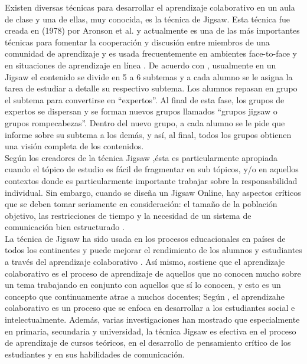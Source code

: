 Existen diversas técnicas para desarrollar el aprendizaje colaborativo en un aula de clase y una de ellas, muy conocida, es la técnica de Jigsaw. Esta técnica fue creada en (1978) por Aronson et al. y actualmente es una de las más importantes técnicas para fomentar la cooperación y discusión entre miembros de una comunidad de aprendizaje y es usada frecuentemente en ambientes face-to-face y en situaciones de aprendizaje en línea \cite{blocher_increasing_2005}. De acuerdo con \cite{aronson_jigsaw_1978}, usualmente en un Jigsaw el contenido se divide en 5 a 6 subtemas y a cada alumno se le asigna la tarea de estudiar a detalle su respectivo subtema. Los alumnos repasan en grupo el subtema para convertirse en “expertos”. Al final de esta fase, los grupos de expertos se dispersan y se forman nuevos grupos llamados “grupos jigsaw o grupos rompecabezas”. Dentro del nuevo grupo, a cada alumno se le pide que informe sobre su subtema a los demás, y así, al final, todos los grupos obtienen una visión completa de los contenidos.\\

Según los creadores de la técnica Jigsaw \cite{aronson_jigsaw_1978} ,ésta es particularmente apropiada cuando el tópico de estudio es fácil de fragmentar en sub tópicos, y/o en aquellos contextos donde es particularmente importante trabajar sobre la responsabilidad individual. Sin embargo, cuando se diseña un Jigsaw Online, hay aspectos críticos que se deben tomar seriamente en consideración: el tamaño de la población objetivo, las restricciones de tiempo y la necesidad de un sistema de comunicación bien estructurado \cite{persico_pozzi_sarti_2008}.\\

La técnica de Jigsaw ha sido usada en los procesos educacionales en países de todos los continentes y puede mejorar el rendimiento de los alumnos y estudiantes a través del aprendizaje colaborativo  \cite{maftei_strengthen_2011}. Así mismo,  sostiene que el aprendizaje colaborativo es el proceso de aprendizaje de aquellos que no conocen mucho sobre un tema trabajando en conjunto con aquellos que sí lo conocen, y esto es un concepto que continuamente atrae a muchos docentes; Según , el aprendizahe colaborativo es un proceso que se enfoca en desarrollar a los estudiantes social e intelectualmente. Además, varias investigaciones han mostrado que especialmente en primaria, secundaria y universidad, la técnica Jigsaw es efectiva en el proceso de aprendizaje de cursos teóricos, en el desarrollo de pensamiento crítico de los estudiantes y en sus habilidades de comunicación.\\

